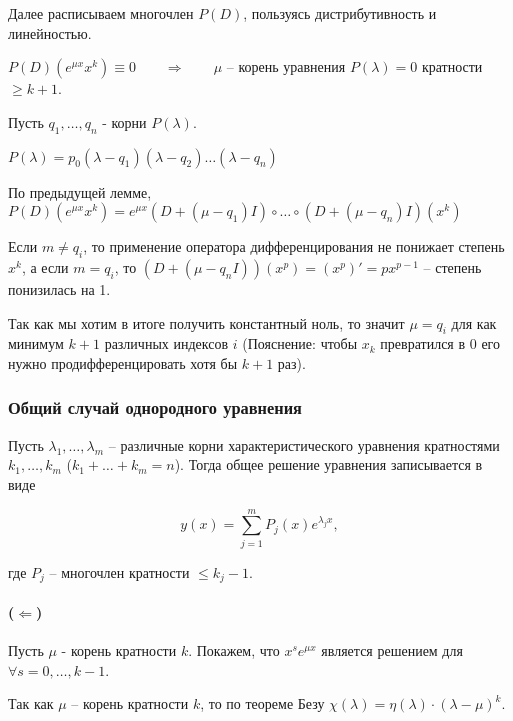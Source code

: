 Далее расписываем многочлен $P(D)$, пользуясь дистрибутивность и линейностью.

\Endproof

\Lemma $P(D)(e^{\mu x} x^k) \equiv 0 \qquad \Rightarrow \qquad \mu$ -- корень уравнения $P(\lambda) = 0$ кратности $\geq k+1$.

\Proof

Пусть $q_1, \dots, q_n$ - корни $P(\lambda)$.

$P(\lambda) = p_0 (\lambda - q_1) (\lambda - q_2) \dots (\lambda - q_n)$

По предыдущей лемме, $P(D)(e^{\mu x} x^k) = e^{\mu x} (D + (\mu - q_1) I) \circ \dots \circ (D + (\mu - q_n) I) (x^k)$

Если $m \neq q_i$, то применение оператора дифференцирования не понижает степень $x^k$, а если $m = q_i$, то $(D + (\mu - q_n I)) (x^p) = (x^p)' = px^{p-1}$ -- степень понизилась на 1.

Так как мы хотим в итоге получить константный ноль, то значит $\mu = q_i$ для как минимум $k+1$ различных индексов $i$ (Пояснение: чтобы $x_k$ превратился в 0 его нужно продифференцировать хотя бы $k+1$ раз).

\Endproof

\subsubsection{Общий случай однородного уравнения}

\Th Пусть $\lambda_1, \dots, \lambda_m$ -- различные корни характеристического уравнения кратностями $k_1, \dots, k_m$ ($k_1 + \dots + k_m = n$).
Тогда общее решение уравнения записывается в виде

\begin{equation}
    y(x) = \sum_{j=1}^m P_j(x) e^{\lambda_j x},
    \label{eq:lin_diff_eq_const_coef_full_sol}
\end{equation}

где $P_j$ -- многочлен кратности $\leq k_j - 1$.

\Proof

\paragraph{($\Leftarrow$)} Пусть $\mu$ - корень кратности $k$. Покажем, что $x^s e^{\mu x}$ является решением для $\forall s=0, \dots, k-1$.

Так как $\mu$ -- корень кратности $k$, то по теореме Безу $\chi(\lambda) = \eta(\lambda) \cdot (\lambda - \mu)^k$.


